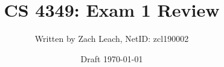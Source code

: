 

\title{\Huge CS 4349: Exam 1 Review}
\author{\Large Written by Zach Leach, NetID: zcl190002}
\date{\Large Draft \today \\[36pt]}


\maketitle



